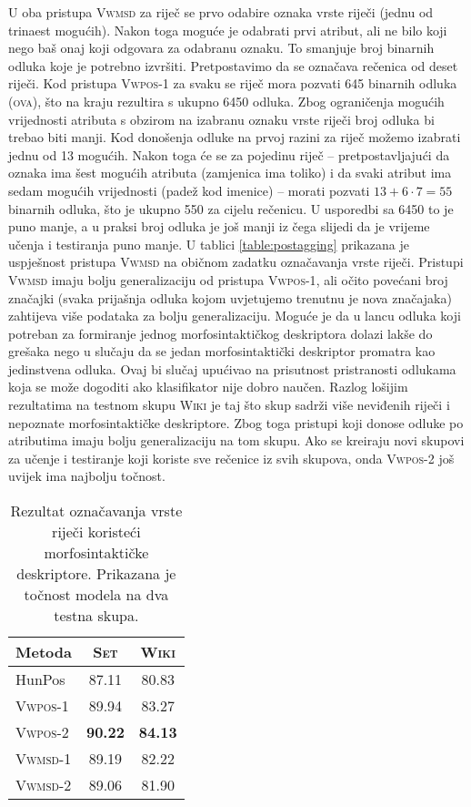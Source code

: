 U oba pristupa \textsc{Vwmsd} za riječ se prvo odabire oznaka vrste riječi
(jednu od trinaest mogućih). Nakon toga moguće je odabrati prvi atribut, ali ne
bilo koji nego baš onaj koji odgovara za odabranu oznaku. To smanjuje broj
binarnih odluka koje je potrebno izvršiti. Pretpostavimo da se označava rečenica
od deset riječi. Kod pristupa \textsc{Vwpos-1} za svaku se riječ mora pozvati
645 binarnih odluka (\textsc{ova}), što na kraju rezultira s ukupno 6450 odluka.
Zbog ograničenja mogućih vrijednosti atributa s obzirom na izabranu oznaku vrste
riječi broj odluka bi trebao biti manji. Kod donošenja odluke na prvoj razini za
riječ možemo izabrati jednu od 13 mogućih. Nakon toga će se za pojedinu riječ --
pretpostavljajući da oznaka ima šest mogućih atributa (zamjenica ima toliko) i da
svaki atribut ima sedam mogućih vrijednosti (padež kod imenice) -- morati pozvati
$13+6 \cdot 7 = 55$ binarnih odluka, što je ukupno 550 za cijelu rečenicu. U
usporedbi sa 6450 to je puno manje, a u praksi broj odluka je još manji iz čega
slijedi da je vrijeme učenja i testiranja puno manje. U tablici
\ref{table:postagging} prikazana je uspješnost pristupa \textsc{Vwmsd} na
običnom zadatku označavanja vrste riječi. Pristupi \textsc{Vwmsd} imaju bolju
generalizaciju od pristupa \textsc{Vwpos-1}, ali očito povećani broj značajki
(svaka prijašnja odluka kojom uvjetujemo trenutnu je nova značajaka) zahtijeva
više podataka za bolju generalizaciju. Moguće je da u lancu odluka koji potreban
za formiranje jednog morfosintaktičkog deskriptora dolazi lakše do grešaka nego
u slučaju da se jedan morfosintaktički deskriptor promatra kao jedinstvena
odluka. Ovaj bi slučaj upućivao na prisutnost pristranosti odlukama koja se može
dogoditi ako klasifikator nije dobro naučen. Razlog lošijim rezultatima na
testnom skupu \textsc{Wiki} je taj što skup sadrži više neviđenih riječi i
nepoznate morfosintaktičke deskriptore. Zbog toga pristupi koji donose odluke po
atributima imaju bolju generalizaciju na tom skupu. Ako se kreiraju novi skupovi
za učenje i testiranje koji koriste sve rečenice iz svih skupova, onda
\textsc{Vwpos-2} još uvijek ima najbolju točnost.

\begin{table}
\centering
\caption[Rezultat označavanja vrste riječi koristeći morfosintaktičke
deskriptore.]{Rezultat označavanja vrste riječi koristeći morfosintaktičke
deskriptore. Prikazana je točnost modela na dva testna skupa.}
\label{table:msdtagging}
\begin{tabular}{|l|c|c|}
\hline
Metoda                               & \textsc{Set}   & \textsc{Wiki}  \\ \hline \hline
HunPos \citep{agic2013lemmatization} & 87.11          & 80.83          \\
\textsc{Vwpos-1}                     & 89.94          & 83.27          \\
\textsc{Vwpos-2}                     & \textbf{90.22} & \textbf{84.13} \\
\textsc{Vwmsd-1}                     & 89.19          & 82.22          \\
\textsc{Vwmsd-2}                     & 89.06          & 81.90          \\ \hline
\end{tabular}
\end{table}
